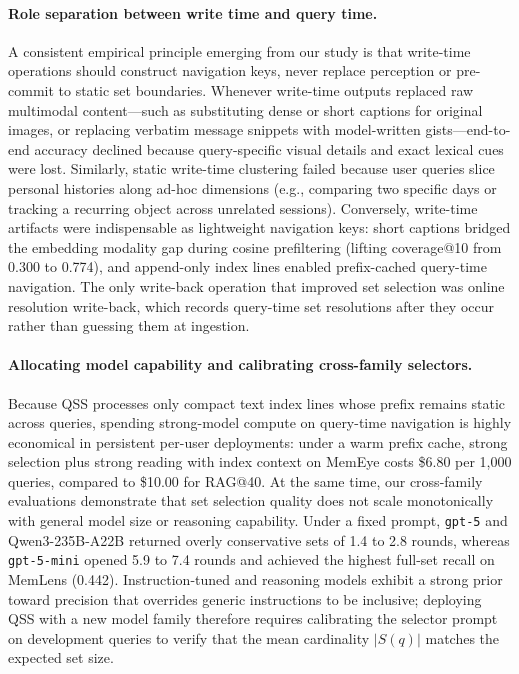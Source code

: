 \documentclass[10pt]{article}
\newcommand{\qss}{QSS}
\begin{document}
\paragraph{Role separation between write time and query time.} A consistent empirical principle emerging from our study is that write-time operations should construct navigation keys, never replace perception or pre-commit to static set boundaries. Whenever write-time outputs replaced raw multimodal content—such as substituting dense or short captions for original images, or replacing verbatim message snippets with model-written gists—end-to-end accuracy declined because query-specific visual details and exact lexical cues were lost. Similarly, static write-time clustering failed because user queries slice personal histories along ad-hoc dimensions (e.g., comparing two specific days or tracking a recurring object across unrelated sessions). Conversely, write-time artifacts were indispensable as lightweight navigation keys: short captions bridged the embedding modality gap during cosine prefiltering (lifting coverage@10 from 0.300 to 0.774), and append-only index lines enabled prefix-cached query-time navigation. The only write-back operation that improved set selection was online resolution write-back, which records query-time set resolutions after they occur rather than guessing them at ingestion.

\paragraph{Allocating model capability and calibrating cross-family selectors.} Because \qss{} processes only compact text index lines whose prefix remains static across queries, spending strong-model compute on query-time navigation is highly economical in persistent per-user deployments: under a warm prefix cache, strong selection plus strong reading with index context on MemEye costs \$6.80 per 1,000 queries, compared to \$10.00 for RAG@40. At the same time, our cross-family evaluations demonstrate that set selection quality does not scale monotonically with general model size or reasoning capability. Under a fixed prompt, \texttt{gpt-5} and Qwen3-235B-A22B returned overly conservative sets of 1.4 to 2.8 rounds, whereas \texttt{gpt-5-mini} opened 5.9 to 7.4 rounds and achieved the highest full-set recall on MemLens (0.442). Instruction-tuned and reasoning models exhibit a strong prior toward precision that overrides generic instructions to be inclusive; deploying \qss{} with a new model family therefore requires calibrating the selector prompt on development queries to verify that the mean cardinality $|S(q)|$ matches the expected set size.
\end{document}
